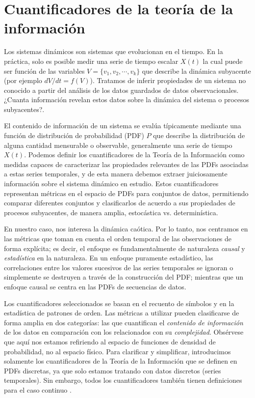 \section{Cuantificadores de la teoría de la información}

Los sistemas dinámicos son sistemas que evolucionan en el tiempo.
En la práctica, solo es posible medir una serie de tiempo escalar $X(t)$ la cual puede ser función de las variables $V=\{ v_1, v_2,\cdots, v_k\}$ que describe la dinámica subyacente (por ejemplo $dV/dt=f(V)$).
Tratamos de inferir propiedades de un sistema no conocido a partir del análisis de los datos guardados de datos observacionales.
¿Cuanta información revelan estos datos sobre la dinámica del sistema o procesos subyacentes?.

El contenido de información de un sistema se evalúa típicamente mediante una función de distribución de probabilidad (PDF) $P$ que describe la distribución de alguna cantidad mensurable o observable, generalmente una serie de tiempo $X(t)$.
Podemos definir los cuantificadores de la Teoría de la Información como medidas capaces de caracterizar las propiedades relevantes de las PDFs asociadas a estas series temporales, y de esta manera debemos extraer juiciosamente información sobre el sistema dinámico en estudio.
Estos cuantificadores representan métricas en el espacio de PDFs para conjuntos de datos, permitiendo comparar diferentes conjuntos y clasificarlos de acuerdo a sus propiedades de procesos subyacentes, de manera amplia, estocástica vs. determinística.

En nuestro caso, nos interesa la dinámica caótica.
Por lo tanto, nos centramos en las métricas que toman en cuenta el orden temporal de las observaciones de forma explícita; es decir, el enfoque es fundamentalmente de naturaleza \textit{causal} y \textit{estadística} en la naturaleza.
En un enfoque puramente estadístico, las correlaciones entre los valores sucesivos de las series temporales se ignoran o simplemente se destruyen a través de la construcción del PDF; mientras que un enfoque causal se centra en las PDFs de secuencias de datos.

Los cuantificadores seleccionados se basan en el recuento de símbolos y en la estadística de patrones de orden.
Las métricas a utilizar pueden clasificarse de forma amplia en dos categorías: las que cuantifican el \textit{contenido de información} de los datos en comparación con los relacionados con su \textit{complejidad}.
Obsérvese que aquí nos estamos refiriendo al espacio de funciones de densidad de probabilidad, no al espacio físico.
Para clarificar y simplificar, introducimos solamente los cuantificadores de la Teoría de la Información que se definen en PDFs discretas, ya que solo estamos tratando con datos discretos (series temporales).
Sin embargo, todos los cuantificadores también tienen definiciones para el caso continuo \cite{Shannon1948}.

